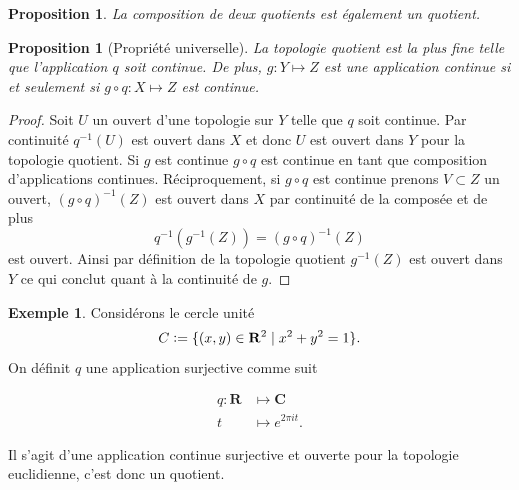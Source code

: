 \documentclass[12pt]{book}
\newcommand{\defeq}{\vcentcolon=}
\newtheorem{prop}[lemma]{Proposition}
\theoremstyle{definition}
\newtheorem{example}[lemma]{Exemple}
\theoremstyle{remark}
\begin{document}
	\begin{prop}
		La composition de deux quotients est également un quotient.
	\end{prop}
	\begin{prop}[Propriété universelle]
		La topologie quotient est la plus fine telle que l'application $q$ soit continue. De plus, $g : Y \longmapsto Z$ est une application continue si et seulement si $g \circ q : X \longmapsto Z$ est continue.
	\end{prop}
	\begin{proof}
		Soit $U$ un ouvert d'une topologie sur $Y$ telle que $q$ soit continue. Par continuité $q^{-1}(U)$ est ouvert dans $X$ et donc $U$ est ouvert dans $Y$ pour la topologie quotient. 
	Si $g$ est continue $g \circ q$ est continue en tant que composition d'applications continues. Réciproquement, si  $g \circ q$ est continue prenons $V \subset Z$ un ouvert, ${(g\circ q)}^{-1}(Z)$ est ouvert dans $X$ par continuité de la composée et de plus \[
			q^{-1}(g^{-1}(Z)) = (g \circ q)^{-1}(Z)
		\] est ouvert. Ainsi par définition de la topologie quotient $g^{-1}(Z)$ est ouvert dans $Y$ ce qui conclut quant à la continuité de $g$. 
	\end{proof}
	\begin{example}
		Considérons le cercle unité \[
			C \defeq \{(x,y) \in \mathbf{R}^2 \;|\; x^2 + y^2 = 1\} 
		.\] 
		On définit $q$ une application surjective comme suit \\ 
		\begin{minipage}{0.5\textwidth}
			\begin{align*}
				q : \mathbf{R} &\longmapsto \mathbf{C}\\
				t&\longmapsto e^{2\pi it}
			.\end{align*}	
		\end{minipage}
		\hfill
		\begin{minipage}{0.5\textwidth}
			\centering
		\end{minipage}
		\bigskip

		Il s'agit d'une application continue surjective et ouverte pour la topologie euclidienne, c'est donc un quotient.
	\end{example}
	
\end{document}
